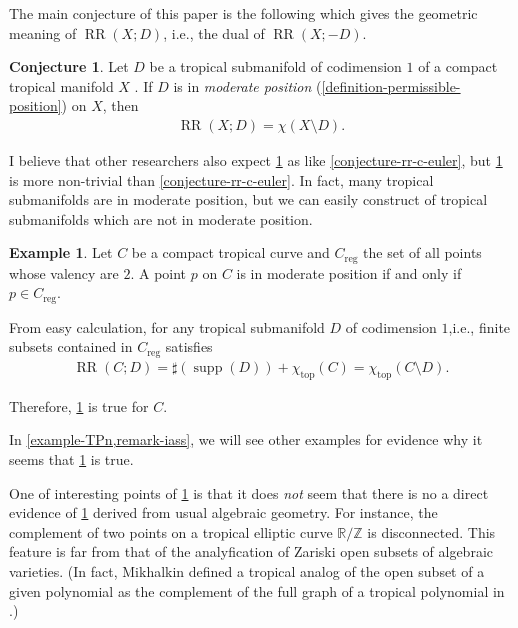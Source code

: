 \documentclass[a4paper,dvipdfmx,reqno,12pt]{amsart}
\theoremstyle{definition}
\newtheorem{example}[theorem]{Example}
\newtheorem{conjecture}[theorem]{Conjecture}
\newcommand{\opn}[1]{\operatorname{#1}}
\numberwithin{equation}{section}
\begin{document}
The main conjecture of this paper is the following 
which gives
the geometric meaning of $\opn{RR}(X;D)$, i.e.,
the dual of $\opn{RR}(X;-D)$.

\begin{conjecture}
\label{conjecture-rr-euler}
Let $D$ be a tropical submanifold of codimension 
$1$ of a compact tropical manifold $X$
\cite[Definition 2.14]{demedrano2023chern}.
If $D$ is in \emph{moderate position}
(\cref{definition-permissible-position}) on $X$,
then 
\begin{align}
\opn{RR}(X;D)=\chi(X\setminus D).
\end{align}
\end{conjecture}
I believe that other researchers also expect
\cref{conjecture-rr-euler} as like
\cref{conjecture-rr-c-euler},
but \cref{conjecture-rr-euler} is more non-trivial than
\cref{conjecture-rr-c-euler}.
In fact, many tropical submanifolds are in moderate position,
but we can easily construct of tropical submanifolds
which are not in moderate position.

\begin{example}
\label{example-permissible-point}
Let $C$ be a compact tropical curve 
and $C_{\mathrm{reg}}$ the set of all
points whose valency are $2$.
A point $p$ on $C$ is in moderate position
if and only if $p\in C_{\mathrm{reg}}$.

From easy calculation, for any 
tropical submanifold $D$ of codimension $1$,i.e.,
finite subsets contained in $C_{\mathrm{reg}}$ 
satisfies
\begin{align}
\opn{RR}(C;D)=\sharp (\opn{supp}(D))+ \chi_{\opn{top}}(C)
=\chi_{\opn{top}}(C\setminus D).
\end{align}

Therefore, \cref{conjecture-rr-euler} is true
for $C$.
\end{example}
In \cref{example-TPn,remark-iass},
we will see other examples for evidence 
why it seems that \cref{conjecture-rr-euler}
is true.

One of interesting points of
\cref{conjecture-rr-euler} is that
it does \emph{not} seem that there is
no a direct evidence of \cref{conjecture-rr-euler}
derived from usual algebraic geometry.  
For instance, the complement of two points 
on a tropical elliptic curve
$\mathbb{R}/\mathbb{Z}$ is disconnected.
This feature is far from that of the analyfication of Zariski open subsets of
algebraic varieties.
(In fact, Mikhalkin defined
a tropical analog of the open subset of
a given polynomial as the complement of
the full graph \cite[]{MR2275625}
of a tropical polynomial in
\cite[Remark 3.5 and Example 3.6]{MR2275625}.)
\end{document}
